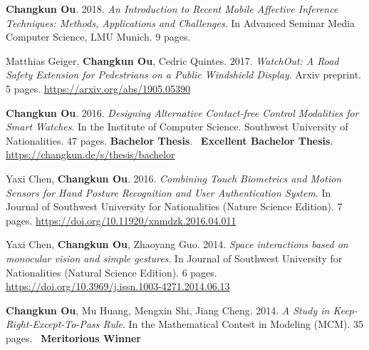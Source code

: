     \item{
        \textbf{Changkun Ou}. 2018.
        \emph{An Introduction to Recent Mobile Affective Inference Techniques: Methods, Applications and Challenges}.
        In Advanced Seminar Media Computer Science, LMU Munich. 9 pages.
    }
    \item{
        Matthias Geiger, \textbf{Changkun Ou}, Cedric Quintes. 2017.
        \emph{WatchOut: A Road Safety Extension for Pedestrians on a Public Windshield Display}.
        Arxiv preprint. 5 pages.
        \url{https://arxiv.org/abs/1905.05390}
    }
    \item{
        \textbf{Changkun Ou}. 2016.
        \emph{Designing Alternative Contact-free Control Modalities for Smart Watches}.
        In the Institute of Computer Science. Southwest University of Nationalities. 47 pages. \textbf{Bachelor Thesis}. \faAward~\textbf{Excellent Bachelor Thesis}.
        \url{https://changkun.de/s/thesis/bachelor}
    }
    \item{
        Yaxi Chen, \textbf{Changkun Ou}. 2016.
        \emph{Combining Touch Biometrics and Motion Sensors for Hand Posture Recognition and User Authentication System}.
        In Journal of Southwest University for Nationalities (Nature Science Edition). 7 pages.
        \url{https://doi.org/10.11920/xnmdzk.2016.04.011}
    }
    \item{
        Yaxi Chen, \textbf{Changkun Ou}, Zhaoyang Guo. 2014.
        \emph{Space interactions based on monocular vision and simple gestures}.
        In Journal of Southwest University for Nationalities (Natural Science Edition). 6 pages.
        \url{https://doi.org/10.3969/j.issn.1003-4271.2014.06.13}
    }
    \item{
        \textbf{Changkun Ou}, Mu Huang, Mengxin Shi, Jiang Cheng. 2014.
        \emph{A Study in Keep-Right-Except-To-Pass Rule}.
        In the Mathematical Contest in Modeling (MCM). 35 pages. \faAward~\textbf{Meritorious Winner}
    }
\resumeSubHeadingListEnd